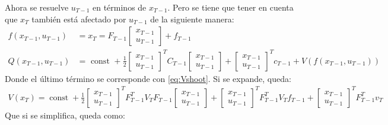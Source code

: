 Ahora se resuelve $u_{T-1}$ en términos de $x_{T-1}$. Pero se tiene que tener en cuenta que
$x_T$ también está afectado por $u_{T-1}$ de la siguiente manera:
\begin{align}
    f ( x _ { T - 1 } , u _ { T - 1 } ) &= x _ { T } = F _ { T - 1 } \left[ \begin{array} { c } { x _
{ T - 1 } } \\ { u _ { T - 1 } } \end{array} \right] + f _ { T - 1 }\\
Q(x_{T-1},u_{T-1}) &= \text { const } + \frac { 1 } { 2 } \left[ \begin{array} { c } { x _ { T - 1 } } \\ { u _ { T - 1 } } \end{array} \right] ^ { T } C _ { T - 1 } \left[ \begin{array} { c } { x _ { T - 1 } } \\ { u _ { T - 1 } } \end{array} \right] + \left[ \begin{array} { c } { x _ { T - 1 } } \\ { u _ { T - 1 } } \end{array} \right] ^ { T } c _ { T - 1 } + V ( f ( x _ { T - 1 } , u _ { T - 1 } ) )
\end{align}
Donde el último término se corresponde con \ref{eq:Vshoot}. Si se expande, queda:
\begin{align}
V ( x _ { T } ) = \operatorname { const } + \frac { 1 } { 2 } \left[ \begin{array} { c } { x _ { T - 1 } } \\ { u _ { T - 1 } } \end{array} \right] ^ { T } F _ { T - 1 } ^ { T } V _ { T } F _ { T - 1 } \left[ \begin{array} { c } { x _ { T - 1 } } \\ { u _ { T - 1 } } \end{array} \right] + \left[ \begin{array} { c } { x _ { T - 1 } } \\ { u _ { T - 1 } } \end{array} \right] ^ { T } F _ { T - 1 } ^ { T } V _ { T } f _ { T - 1 } + \left[ \begin{array} { c } { x _ { T - 1 } } \\ { u _ { T - 1 } } \end{array} \right] ^ { T } F _ { T - 1 } ^ { T } v _ { T }
\end{align}
Que si se simplifica, queda como:
